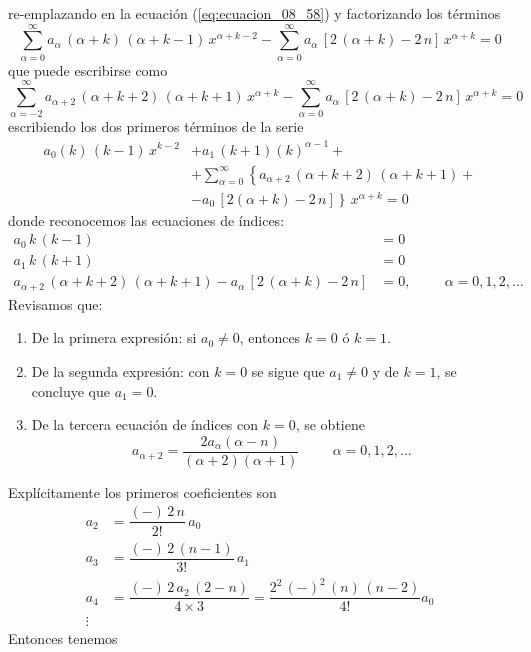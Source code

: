 re-emplazando en la ecuación (\ref{eq:ecuacion_08_58}) y factorizando los términos
\[ \sum_{\alpha = 0}^{\infty} a_{\alpha} \, (\alpha + k) \, (\alpha + k - 1) \, x^{\alpha+k-2} - \sum_{\alpha=0}^{\infty} a_{\alpha} \, [ 2 \, (\alpha + k) - 2 \, n] \, x^{\alpha+k} = 0 \]
que puede escribirse como
\[ \sum_{\alpha=-2}^{\infty} a_{\alpha + 2} \, ( \alpha + k + 2) \, (\alpha + k + 1)\, x^{\alpha+k} - \sum_{\alpha=0}^{\infty} a_{\alpha} \, [2 \, (\alpha + k) - 2 \, n] \, x^{\alpha+k} = 0 \]
escribiendo los dos primeros términos de la serie
\begin{align*}
 a_{0}(k) \, (k - 1)\, x^{k-2} &+ a_{1} \, (k + 1)(k)^{\alpha-1} + \\
&+ \sum_{\alpha=0}^{\infty} \left\{ a_{\alpha + 2} \, (\alpha + k +2) \, (\alpha + k + 1) + \right. \\
&- \left. a_{0} \, [2 (\alpha + k ) - 2 \, n] \right\} \, x^{\alpha+k} = 0 
\end{align*}
donde reconocemos las ecuaciones de índices:
\begin{align*}
a_{0}\, k \, (k-1) &= 0 \\
a_{1} \, k\, (k+1) &= 0 \\
a_{\alpha+2}\, (\alpha + k + 2) \, (\alpha + k + 1) - a_{\alpha} \, [2 \, (\alpha + k) - 2 \, n] &= 0, \hspace{1cm} \alpha=0, 1, 2, \ldots
\end{align*}
Revisamos que:
\begin{enumerate}
\item De la primera expresión: si $a_{0} \neq 0$, entonces $k=0$ ó $k=1$.
\item De la segunda expresión: con $k=0$ se sigue que $a_{1} \neq 0$ y de $k=1$, se concluye que $a_{1} = 0$.
\item De la tercera ecuación de índices con $k=0$, se obtiene
\[ a_{\alpha+2} = \dfrac{2a_{\alpha}(\alpha - n)}{(\alpha + 2)(\alpha + 1)} \hspace{1cm} \alpha = 0, 1, 2, \ldots \]
\end{enumerate}
Explícitamente los primeros coeficientes son
\begin{align*}
a_{2} &= \dfrac{(-) \, 2 \, n}{2!} \, a_{0} \\
a_{3} &= \dfrac{(-) \, 2 \, (n-1)}{3!} \, a_{1} \\
a_{4} &= \dfrac{(-) \, 2 \, a_{2} \, (2 - n)}{4 \times 3} = \dfrac{2^{2} \, (-)^{2} \, (n) \, (n - 2)}{4!} a_{0} \\
\vdots
\end{align*}
Entonces tenemos
